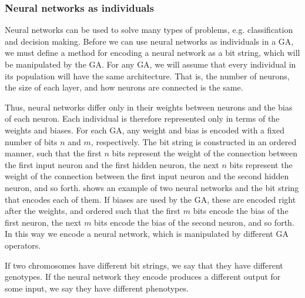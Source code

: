 \subsubsection{Neural networks as individuals}

Neural networks can be used to solve many types of problems, e.g. classification and decision making.
Before we can use neural networks as individuals in a GA, we must define a method for encoding a neural network as a bit string, which will be manipulated by the GA. For any GA, we will assume that every individual in its population will have the same architecture. That is, the number of neurons, the size of each layer, and how neurons are connected is the same.


Thus, neural networks differ only in their weights between neurons and the bias of each neuron. Each individual is therefore represented only in terms of the weights and biases. For each GA, any weight and bias is encoded with a fixed number of bits $n$ and $m$, respectively. The bit string is constructed in an ordered manner, such that the first $n$ bits represent the weight of the connection between the first input neuron and the first hidden neuron, the next $n$ bits represent the weight of the connection between the first input neuron and the second hidden neuron, and so forth.  shows an example of two neural networks and the bit string that encodes each of them. If biases are used by the GA, these are encoded right after the weights, and ordered such that the first $m$ bits encode the bias of the first neuron, the next $m$ bits encode the bias of the second neuron, and so forth. In this way we encode a neural network, which is manipulated by different GA operators.

If two chromosomes have different bit strings, we say that they have different genotypes. If the neural network they encode produces a different output for some input, we say they have different phenotypes.



%
